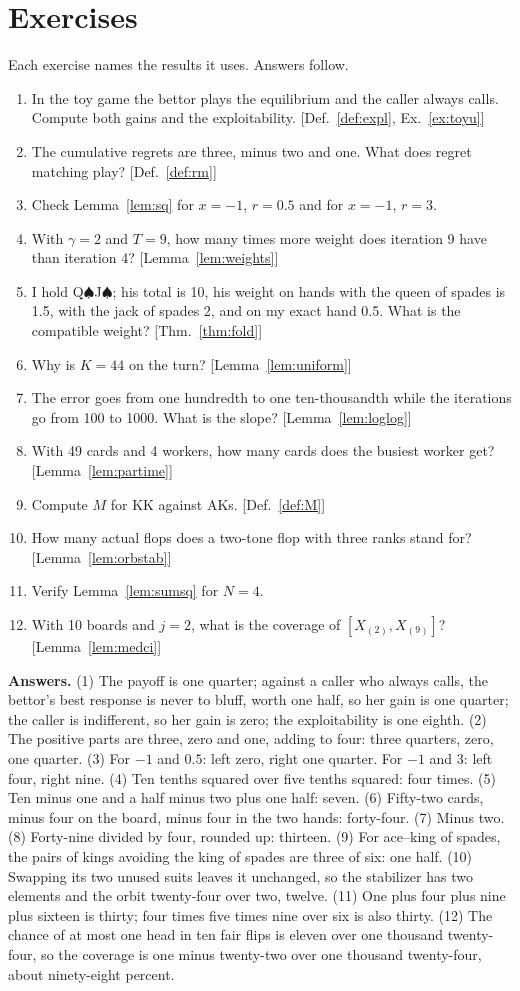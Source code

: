 \documentclass[11pt]{article}
\newcommand{\SP}{\ensuremath{\spadesuit}}\newcommand{\HE}{\ensuremath{\heartsuit}}
\theoremstyle{definition}
\newcommand{\Def}[1]{Def.~\ref{#1}}\newcommand{\Lem}[1]{Lemma~\ref{#1}}\newcommand{\Thm}[1]{Thm.~\ref{#1}}
\newcommand{\Ex}[1]{Ex.~\ref{#1}}\newcommand{\Rem}[1]{Remark~\ref{#1}}\newcommand{\Alg}[1]{Alg.~\ref{#1}}\newcommand{\Cor}[1]{Cor.~\ref{#1}}
\begin{document}
\section{Exercises}
Each exercise names the results it uses. Answers follow.
\begin{enumerate}[itemsep=2pt]
\item In the toy game the bettor plays the equilibrium and the caller always calls. Compute both gains and the
exploitability. [\Def{def:expl}, \Ex{ex:toyu}]
\item The cumulative regrets are three, minus two and one. What does regret matching play? [\Def{def:rm}]
\item Check \Lem{lem:sq} for $x=-1$, $r=0.5$ and for $x=-1$, $r=3$.
\item With $\gamma=2$ and $T=9$, how many times more weight does iteration 9 have than iteration 4? [\Lem{lem:weights}]
\item I hold Q\SP J\SP; his total is 10, his weight on hands with the queen of spades is 1.5, with the jack of spades 2, and on
my exact hand 0.5. What is the compatible weight? [\Thm{thm:fold}]
\item Why is $K=44$ on the turn? [\Lem{lem:uniform}]
\item The error goes from one hundredth to one ten-thousandth while the iterations go from 100 to 1000. What is the slope?
[\Lem{lem:loglog}]
\item With 49 cards and 4 workers, how many cards does the busiest worker get? [\Lem{lem:partime}]
\item Compute $M$ for KK against AKs. [\Def{def:M}]
\item How many actual flops does a two-tone flop with three ranks stand for? [\Lem{lem:orbstab}]
\item Verify \Lem{lem:sumsq} for $N=4$.
\item With 10 boards and $j=2$, what is the coverage of $[X_{(2)},X_{(9)}]$? [\Lem{lem:medci}]
\end{enumerate}
\textbf{Answers.}
(1) The payoff is one quarter; against a caller who always calls, the bettor's best response is never to bluff, worth one
half, so her gain is one quarter; the caller is indifferent, so her gain is zero; the exploitability is one eighth.
(2) The positive parts are three, zero and one, adding to four: three quarters, zero, one quarter.
(3) For $-1$ and $0.5$: left zero, right one quarter. For $-1$ and $3$: left four, right nine.
(4) Ten tenths squared over five tenths squared: four times.
(5) Ten minus one and a half minus two plus one half: seven.
(6) Fifty-two cards, minus four on the board, minus four in the two hands: forty-four.
(7) Minus two.
(8) Forty-nine divided by four, rounded up: thirteen.
(9) For ace--king of spades, the pairs of kings avoiding the king of spades are three of six: one half.
(10) Swapping its two unused suits leaves it unchanged, so the stabilizer has two elements and the orbit twenty-four over
two, twelve.
(11) One plus four plus nine plus sixteen is thirty; four times five times nine over six is also thirty.
(12) The chance of at most one head in ten fair flips is eleven over one thousand twenty-four, so the coverage is one minus
twenty-two over one thousand twenty-four, about ninety-eight percent.
\end{document}
